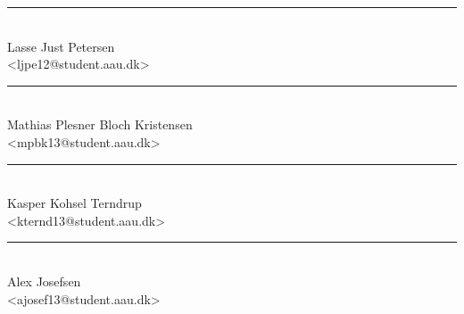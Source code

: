 \noindent
\begin{minipage}[b]{0.45\textwidth}
 \centering
 \rule{\textwidth}{0.5pt}\\
 Lasse Just Petersen\\
 {\footnotesize <ljpe12@student.aau.dk>}
\end{minipage}
%
\hfill
%
\begin{minipage}[b]{0.45\textwidth}
 \centering
 \rule{\textwidth}{0.5pt}\\
  Mathias Plesner Bloch Kristensen\\
 {\footnotesize <mpbk13@student.aau.dk>}
\end{minipage}
\vspace{3\baselineskip}

\noindent
\begin{minipage}[b]{0.45\textwidth}
 \centering
 \rule{\textwidth}{0.5pt}\\
 Kasper Kohsel Terndrup\\
 {\footnotesize <kternd13@student.aau.dk>}
\end{minipage}
\hfill
\begin{minipage}[b]{0.45\textwidth}
 \centering
 \rule{\textwidth}{0.5pt}\\
  Alex Josefsen\\
 {\footnotesize <ajosef13@student.aau.dk>}
\end{minipage}
\vspace{3\baselineskip}
